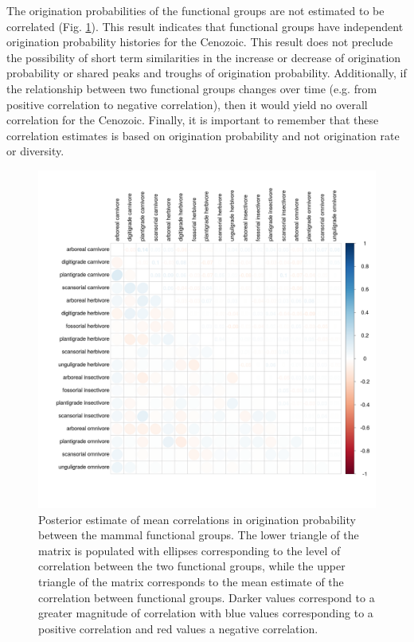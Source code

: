 \documentclass[12pt,letterpaper]{article}
\begin{document}
The origination probabilities of the functional groups are not estimated to be correlated (Fig. \ref{fig:origin_corr}). This result indicates that functional groups have independent origination probability histories for the Cenozoic. This result does not preclude the possibility of short term similarities in the increase or decrease of origination probability or shared peaks and troughs of origination probability. Additionally, if the relationship between two functional groups changes over time (e.g. from positive correlation to negative correlation), then it would yield no overall correlation for the Cenozoic. Finally, it is important to remember that these correlation estimates is based on origination probability and not origination rate or diversity.
\begin{figure}[ht]
  \centering
  \includegraphics[width=\textwidth,height=\textheight,keepaspectratio=true]{figure/origination_correlation}
  \caption{Posterior estimate of mean correlations in origination probability between the mammal functional groups. The lower triangle of the matrix is populated with ellipses corresponding to the level of correlation between the two functional groups, while the upper triangle of the matrix corresponds to the mean estimate of the correlation between functional groups. Darker values correspond to a greater magnitude of correlation with blue values corresponding to a positive correlation and red values a negative correlation.}
  \label{fig:origin_corr}
\end{figure}
\end{document}

